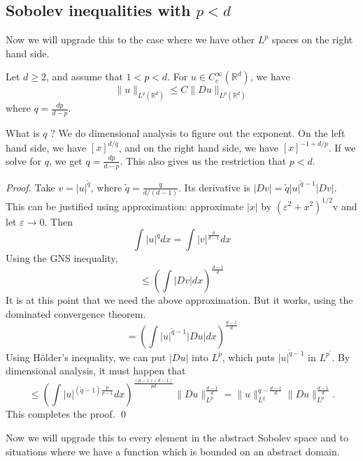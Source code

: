 \subsection{Sobolev inequalities with $p<d$}
Now we will upgrade this to the case where we have other $L^{p}$ spaces on the right hand side.
\begin{theorem}
     Let $d \geq 2$, and assume that $1<p<d$. For $u \in C_{c}^{\infty}\left(\mathbb{R}^{d}\right)$, we have
    $$
    \|u\|_{L^{q}\left(\mathbb{R}^{d}\right) }\leq C\|D u\|_{L^{p}\left(\mathbb{R}^{d}\right)}
    $$
    where $q=\frac{d p}{d-p}$.
\end{theorem}
What is $q$ ? We do dimensional analysis to figure out the exponent. On the left hand side, we have $[x]^{d / q}$, and on the right hand side, we have $[x]^{-1+d / p}$. If we solve for $q$, we get $q=\frac{d p}{d-p}$. This also gives us the restriction that $p<d$.

\vspace{2em}
\begin{proof}
    Take $v=\left|u\right|^{\widetilde{q}}$, where $\widetilde{q}=\frac{q}{d /(d-1)}$. Its derivative is $|D v|=\tilde q|u|^{\tilde q-1}|D v|$. This can be justified using approximation: approximate $|x|$ by $\left(\varepsilon^{2}+x^{2}\right)^{1 / 2} \mathrm{v}$ and let $\varepsilon \rightarrow 0$. Then
    $$
    \int|u|^{q} d x=\int|v|^{\frac{d}{d-1}} d x
    $$
    Using the GNS inequality,
    $$
    \leq\left(\int|D v| d x\right)^{\frac{d-1}{d}}
    $$
    It is at this point that we need the above approximation. But it works, using the dominated convergence theorem.
    $$
    =\left(\int|u|^{\widetilde{q}-1}|D u| d x\right)^{\frac{d-1}{d}}
    $$
    Using H\"older's inequality, we can put $|D u|$ into $L^{p}$, which puts $|u|^{\tilde q-1}$ in $L^{p^{\prime}}$. By dimensional analysis, it must happen that
    $$
\leq (\int |u| ^{(\tilde q-1)\frac{p}{p-1}} dx )^{\frac{(p-1)(d-1)}{pd}}  \|D u\|_{L^{p}}^{\frac{d-1}{d}} = \|u\|_{L^q}^{q - \frac{d-1}{d}} \|Du \|_{L^{p}}^{\frac{d-1}{d}}.
$$
This completes the proof.
\qed 
\end{proof}
Now we will upgrade this to every element in the abstract Sobolev space and to situations where we have a function which is bounded on an abstract domain.

